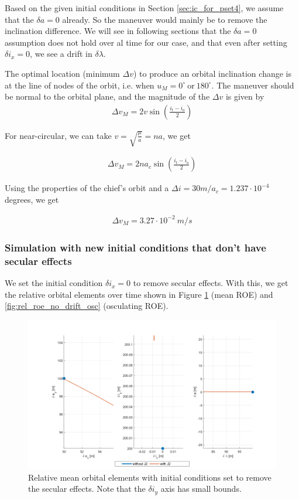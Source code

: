 Based on the given initial conditions in Section \ref{sec:ic_for_pset4}, we assume that the $\delta a = 0$ already. So the maneuver would mainly be to remove the inclination difference. We will see in following sections that the $\delta a = 0$ assumption does not hold over al time for our case, and that even after setting $\delta i_x = 0$, we see a drift in $\delta \lambda$.

The optimal location (minimum $\Delta v$) to produce an orbital inclination change is at the line of nodes of the orbit, i.e. when $u_M = 0^\circ \ \text{or} \ 180^\circ$. The maneuver should be normal to the orbital plane, and the magnitude of the $\Delta v$ is given by
\begin{align}
    \Delta v_M = 2v\sin\left(\frac{i_t - i_o}{2}\right)
\end{align}

For near-circular, we can take $v = \sqrt{\frac{\mu}{a}} = na$, we get

\begin{align}
    \Delta v_M = 2na_c\sin\left(\frac{i_t - i_o}{2}\right)
\end{align}

Using the properties of the chief's orbit and a $\Delta i = 30 m/a_c = 1.237\cdot 10^{-4}$ degrees, we get

\begin{align}
    \Delta v_M = 3.27 \cdot10^{-2} \ m/s
\end{align}

\subsubsection{Simulation with new initial conditions that don't have secular effects}

We set the initial condition $\delta i_x = 0$ to remove secular effects. With this, we get the relative orbital elements over time shown in Figure \ref{fig:rel_roe_no_drift_mean} (mean ROE) and \ref{fig:rel_roe_no_drift_osc} (osculating ROE).

\begin{figure}[H]
    \centering
    \includegraphics[width=0.8\linewidth]{sim/figures/PS4/ROE_projections_mean_no_drift_SV2.png}
    \caption{Relative mean orbital elements with initial conditions set to remove the secular effects. Note that the $\delta i_y$ axis has small bounds.}
    \label{fig:rel_roe_no_drift_mean}
\end{figure}

